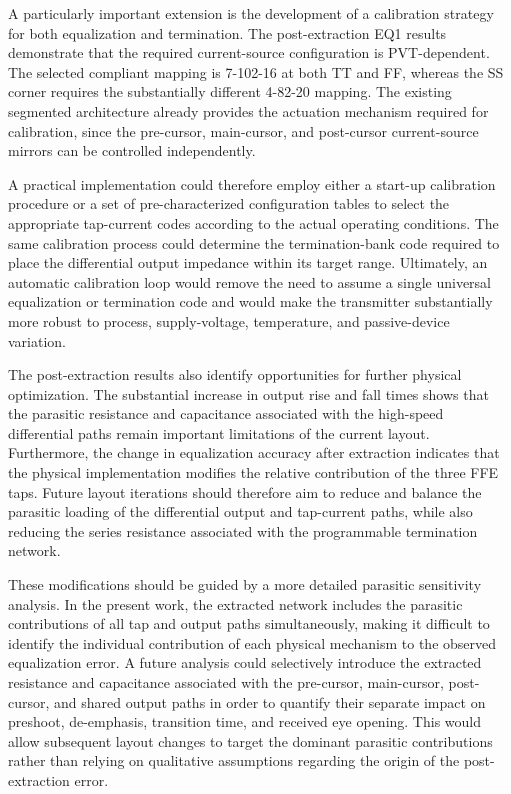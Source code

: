 A particularly important extension is the development of a calibration strategy for both equalization and termination. The post-extraction EQ1 results demonstrate that the required current-source configuration is \ac{PVT}-dependent. The selected compliant mapping is 7-102-16 at both \ac{TT} and \ac{FF}, whereas the \ac{SS} corner requires the substantially different 4-82-20 mapping. The existing segmented architecture already provides the actuation mechanism required for calibration, since the pre-cursor, main-cursor, and post-cursor current-source mirrors can be controlled independently.

A practical implementation could therefore employ either a start-up calibration procedure or a set of pre-characterized configuration tables to select the appropriate tap-current codes according to the actual operating conditions. The same calibration process could determine the termination-bank code required to place the differential output impedance within its target range. Ultimately, an automatic calibration loop would remove the need to assume a single universal equalization or termination code and would make the transmitter substantially more robust to process, supply-voltage, temperature, and passive-device variation.

The post-extraction results also identify opportunities for further physical optimization. The substantial increase in output rise and fall times shows that the parasitic resistance and capacitance associated with the high-speed differential paths remain important limitations of the current layout. Furthermore, the change in equalization accuracy after extraction indicates that the physical implementation modifies the relative contribution of the three \ac{FFE} taps. Future layout iterations should therefore aim to reduce and balance the parasitic loading of the differential output and tap-current paths, while also reducing the series resistance associated with the programmable termination network.

These modifications should be guided by a more detailed parasitic sensitivity analysis. In the present work, the extracted network includes the parasitic contributions of all tap and output paths simultaneously, making it difficult to identify the individual contribution of each physical mechanism to the observed equalization error. A future analysis could selectively introduce the extracted resistance and capacitance associated with the pre-cursor, main-cursor, post-cursor, and shared output paths in order to quantify their separate impact on preshoot, de-emphasis, transition time, and received eye opening. This would allow subsequent layout changes to target the dominant parasitic contributions rather than relying on qualitative assumptions regarding the origin of the post-extraction error.

